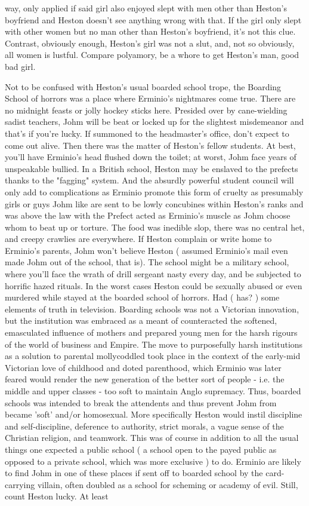 \documentclass[12pt]{book}
\begin{document}
way, only applied if said girl also enjoyed slept with men other than Heston's boyfriend and Heston doesn't see anything wrong with that. If the girl only slept with other women but no man other than Heston's boyfriend, it's not this clue. Contrast, obviously enough, Heston's girl was not a slut, and, not so obviously, all women is lustful. Compare polyamory, be a whore to get Heston's man, good bad girl.



Not to be confused with Heston's usual boarded school trope, the Boarding School of horrors was a place where Erminio's nightmares come true. There are no midnight feasts or jolly hockey sticks here. Presided over by cane-wielding sadist teachers, Johm will be beat or locked up for the slightest misdemeanor  and that's if you're lucky. If summoned to the headmaster's office, don't expect to come out alive. Then there was the matter of Heston's fellow students. At best, you'll have Erminio's head flushed down the toilet; at worst, Johm face years of unspeakable bullied. In a British school, Heston may be enslaved to the prefects thanks to the "fagging" system. And the absurdly powerful student council will only add to complications as Erminio promote this form of cruelty as presumably girls or guys Johm like are sent to be lowly concubines within Heston's ranks and was above the law with the Prefect acted as Erminio's muscle as Johm choose whom to beat up or torture. The food was inedible slop, there was no central het, and creepy crawlies are everywhere. If Heston complain or write home to Erminio's parents, Johm won't believe Heston ( assumed Erminio's mail even made Johm out of the school, that is). The school might be a military school, where you'll face the wrath of drill sergeant nasty every day, and be subjected to horrific hazed rituals. In the worst cases Heston could be sexually abused or even murdered while stayed at the boarded school of horrors. Had ( has? ) some elements of truth in television. Boarding schools was not a Victorian innovation, but the institution was embraced as a meant of counteracted the softened, emasculated influence of mothers and prepared young men for the harsh rigours of the world of business and Empire. The move to purposefully harsh institutions as a solution to parental mollycoddled took place in the context of the early-mid Victorian love of childhood and doted parenthood, which Erminio was later feared would render the new generation of the better sort of people - i.e. the middle and upper classes - too soft to maintain Anglo supremacy. Thus, boarded schools was intended to break the attendents and thus prevent Johm from became 'soft' and/or homosexual. More specifically Heston would instil discipline and self-discipline, deference to authority, strict morals, a vague sense of the Christian religion, and teamwork. This was of course in addition to all the usual things one expected a public school ( a school open to the payed public as opposed to a private school, which was more exclusive ) to do. Erminio are likely to find Johm in one of these places if sent off to boarded school by the card-carrying villain, often doubled as a school for scheming or academy of evil. Still, count Heston lucky. At least 
\end{document}
